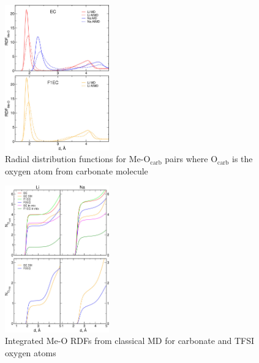 \begin{figure}[ht]
    \centering
    \includegraphics[width=0.4\textwidth]{img/3-structural-data-from-md-simulations/4-carbonates/figure1.png}
    \caption{Radial distribution functions for Me-O$_{\text{carb}}$ pairs where O$_{\text{carb}}$ is the oxygen atom from carbonate molecule}
    \label{fig:carbonates-figure-1}
\end{figure}

\begin{figure}[ht]
    \centering
    \includegraphics[width=0.4\textwidth]{img/3-structural-data-from-md-simulations/4-carbonates/figure2.png}
    \caption{Integrated Me-O RDFs from classical MD for carbonate and TFSI oxygen atoms}
    \label{fig:carbonates-figure-2}
\end{figure}

